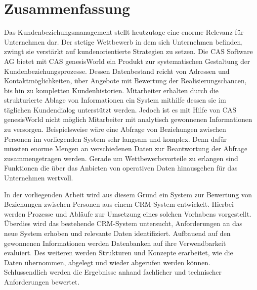 
\chapter*{\centering Zusammenfassung}


Das Kundenbeziehungsmanagement stellt heutzutage eine enorme Relevanz für Unternehmen dar. Der stetige Wettbewerb in dem sich Unternehmen
befinden, zwingt sie verstärkt auf kundenorientierte Strategien zu setzen. Die CAS Software AG bietet mit CAS genesisWorld ein Produkt zur systematischen Gestaltung der Kundenbeziehungsprozesse. Dessen Datenbestand reicht von Adressen und Kontaktmöglichkeiten, über Angebote mit Bewertung der Realisierungschancen, bis hin zu kompletten Kundenhistorien. Mitarbeiter erhalten durch die strukturierte Ablage von Informationen ein System mithilfe dessen sie im täglichen Kundendialog unterstützt werden. Jedoch ist es mit Hilfe von CAS genesisWorld nicht möglich Mitarbeiter mit analytisch gewonnenen Informationen zu versorgen. Beispielsweise wäre eine Abfrage von Beziehungen zwischen Personen im vorliegenden System sehr langsam und komplex. Denn dafür müssten enorme Mengen an verschiedenen Daten zur Beantwortung der Abfrage zusammengetragen werden. Gerade um Wettbewerbsvorteile zu erlangen sind Funktionen die über das Anbieten von operativen Daten hinausgehen für das Unternehmen wertvoll.      

In der vorliegenden Arbeit wird aus diesem Grund ein System zur Bewertung von Beziehungen zwischen Personen aus einem CRM-System entwickelt. Hierbei werden Prozesse und Abläufe zur Umsetzung eines solchen Vorhabens vorgestellt. Überdies wird das bestehende CRM-System untersucht, Anforderungen an das neue System erhoben und relevante Daten identifiziert. Aufbauend auf den gewonnenen Informationen werden Datenbanken auf ihre Verwendbarkeit evaluiert. Des weiteren werden Strukturen und Konzepte erarbeitet, wie die Daten übernommen, abgelegt und wieder abgerufen werden können. Schlussendlich werden die Ergebnisse anhand fachlicher und technischer Anforderungen bewertet.